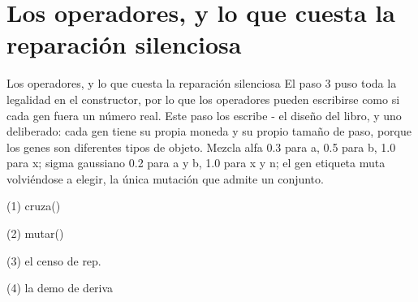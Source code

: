 
\section{Los operadores, y lo que cuesta la reparación silenciosa}

\begin{frame}{Los operadores, y lo que cuesta la reparación silenciosa}
El paso 3 puso toda la legalidad en el constructor, por lo que los operadores pueden escribirse
como si cada gen fuera un número real. Este paso los escribe - el diseño del libro,
y uno deliberado: cada gen tiene su propia moneda y su propio tamaño de paso,
porque los genes son diferentes tipos de objeto. Mezcla alfa 0.3 para
a, 0.5 para b, 1.0 para x; sigma gaussiano 0.2 para a y b, 1.0 para x y n;
el gen etiqueta muta volviéndose a elegir, la única mutación que admite un conjunto.
\end{frame}

\begin{frame}[fragile]{(1) cruza()}

\end{frame}

\begin{frame}[fragile]{(2) mutar()}

\end{frame}

\begin{frame}[fragile]{(3) el censo de rep.}

\end{frame}

\begin{frame}[fragile]{(4) la demo de deriva}

\end{frame}


